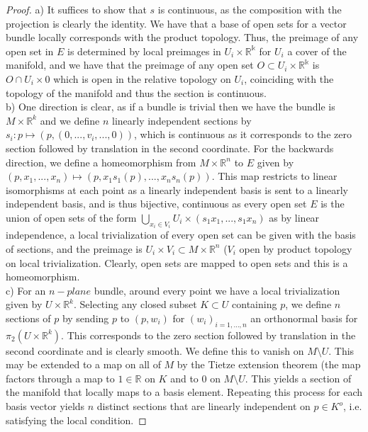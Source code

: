 \documentclass{article}
\begin{document}
\begin{proof}
  a) It suffices to show that $s$ is continuous, as the composition with the projection is clearly the identity. We have that a base of open sets for a vector bundle locally corresponds with the product topology. Thus, the preimage of any open set in $E$ is determined by local preimages in $U_{i}\times \mathbb{R^{k}}$ for $U_{i}$ a cover of the manifold, and we have that the preimage of any open set $O \subset U_{i} \times \mathbb{R^{k}}$ is $O \cap U_{i} \times 0$ which is open in the relative topology on $U_{i}$, coinciding with the topology of the manifold and thus the section is continuous. \\
  b) One direction is clear, as if a bundle is trivial then we have the bundle is $M \times \mathbb{R}^{k}$ and we define $n$ linearly independent sections by $s_{i}: p \mapsto (p, (0,...,v_{i},...,0))$, which is continuous as it corresponds to the zero section followed by translation in the second coordinate. For the backwards direction, we define a homeomorphism from $M \times \mathbb{R}^{n}$ to $E$ given by $(p,x_{1},...,x_{n}) \mapsto (p, x_{1}s_{1}(p),...,x_{n}s_{n}(p))$. This map restricts to linear isomorphisms at each point as a linearly independent basis is sent to a linearly independent basis, and is thus bijective, continuous as every open set $E$ is the union of open sets of the form $\bigcup_{x_{i} \in V_{i}} U_{i}\times (s_{1}x_{1},...,s_{1}x_{n})$ as by linear independence, a local trivialization of every open set can be given with the basis of sections, and the preimage is $U_{i} \times V_{i} \subset  M \times \mathbb{R}^{n}$ ($V_{i}$ open by product topology on local trivialization. Clearly, open sets are mapped to open sets and this is a homeomorphism. \\
  c) For an $n-plane$ bundle, around every point we have a local trivialization given by $U \times \mathbb{R}^{k}$. Selecting any closed subset $K \subset U$ containing $p$, we define $n$ sections of $p$ by sending $p$ to $(p, w_{i})$ for $(w_{i})_{i=1,...,n}$ an orthonormal basis for $\pi_{2}(U \times \mathbb{R}^{k})$. This corresponds to the zero section followed by translation in the second coordinate and is clearly smooth. We define this to vanish on $M \setminus U$. This may be extended to a map on all of $M$ by the Tietze extension theorem (the map factors through a map to $1 \in \mathbb{R}$ on $K$ and to $0$ on $M\setminus U$. This yields a section of the manifold that locally maps to a basis element. Repeating this process for each basis vector yields $n$ distinct sections that are linearly independent on $p \in K^{o}$, i.e. satisfying the local condition. 
\end{proof}
\end{document}
